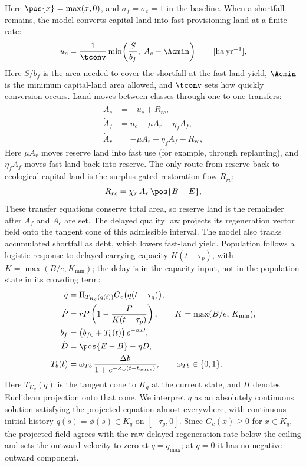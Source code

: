 Here $\pos{x}=\max(x,0)$, and $\sigma_f=\sigma_c=1$ in the baseline. When a shortfall remains, the model converts capital land into fast-provisioning land at a finite rate:
\begin{equation}\label{eq:uc}
u_c=\frac{1}{\tconv}\min\!\left(\frac{S}{b_f},\;A_c-\Acmin\right)\qquad[\mathrm{ha\,yr^{-1}}],
\end{equation}
Here $S/b_f$ is the area needed to cover the shortfall at the fast-land yield, $\Acmin$ is the minimum capital-land area allowed, and $\tconv$ sets how quickly conversion occurs. Land moves between classes through one-to-one transfers:
\begin{align}
\dot A_c&=-u_c+R_{rc},\label{eq:Ac}\\
\dot A_f&=u_c+\mu A_r-\eta_f A_f,\label{eq:Af}\\
\dot A_r&=-\mu A_r+\eta_f A_f-R_{rc},\label{eq:Ar}
\end{align}
Here $\mu A_r$ moves reserve land into fast use (for example, through replanting), and $\eta_f A_f$ moves fast land back into reserve. The only route from reserve back to ecological-capital land is the surplus-gated restoration flow $R_{rc}$:
\begin{equation}\label{eq:Rrc}
R_{rc}=\chi_r\,A_r\,\pos{B-E},
\end{equation}
These transfer equations conserve total area, so reserve land is the remainder after $A_f$ and $A_c$ are set. The delayed quality law projects its regeneration vector field onto the tangent cone of this admissible interval. The model also tracks accumulated shortfall as debt, which lowers fast-land yield. Population follows a logistic response to delayed carrying capacity $K(t-\tau_p)$, with $K=\max(B/e,K_{\min})$; the delay is in the capacity input, not in the population state in its crowding term:
\begin{align}
\dot q&=\Pi_{T_{K_q}(q(t))}G_c\big(q(t-\tau_g)\big),\label{eq:q}\\
\dot P&=rP\left(1-\frac{P}{K(t-\tau_p)}\right),\qquad K=\max(B/e,\,K_{\min}),\label{eq:P}\\
b_f&=\big(b_{f0}+T_b(t)\big)\,e^{-\alpha D},\label{eq:bf}\\
\dot D&=\pos{E-B}-\eta D,\label{eq:D}\\
T_b(t)&=\omega_{Tb}\,\frac{\Delta b}{1+e^{-\kappa_w(t-t_{wave})}},\qquad \omega_{Tb}\in\{0,1\}.\label{eq:Tb}
\end{align}
Here $T_{K_q}(q)$ is the tangent cone to $K_q$ at the current state, and $\Pi$ denotes Euclidean projection onto that cone. We interpret $q$ as an absolutely continuous solution satisfying the projected equation almost everywhere, with continuous initial history $q(s)=\phi(s)\in K_q$ on $[-\tau_g,0]$. Since $G_c(x)\ge0$ for $x\in K_q$, the projected field agrees with the raw delayed regeneration rate below the ceiling and sets the outward velocity to zero at $q=q_{\max}$; at $q=0$ it has no negative outward component.

